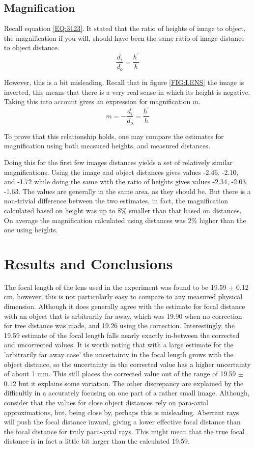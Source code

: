 \documentclass[]{article}
\begin{document}
\subsection{Magnification}
Recall equation \eqref{EQ:3123}. It stated that the ratio of heights of image to object, the magnification if you will, should have been the same ratio of image distance to object distance.
\begin{equation}
	\frac{d_i}{d_o} = \frac{h^\prime}{h}
\end{equation}

However, this is a bit misleading. Recall that in figure \ref{FIG:LENS} the image is inverted, this means that there is a very real sense in which its height is negative. Taking this into account gives an expression for magnification \(m\).
\begin{equation}
	m = -\frac{d_i}{d_o} = \frac{h^\prime}{h}
\end{equation}

To prove that this relationship holds, one may compare the estimates for magnification using both measured heights, and measured distances.

Doing this for the first few images distances yields a set of relatively similar magnifications. Using the image and object distances gives values -2.46, -2.10, and -1.72 while doing the same with the ratio of heights gives values -2.34, -2.03, -1.63. The values are generally in the same area, as they should be. But there is a non-trivial difference between the two estimates, in fact, the magnification calculated based on height was up to 8\% smaller than that based on distances. On average the magnification calculated using distances was 2\% higher than the one using heights. 
\section{Results and Conclusions}
The focal length of the lens used in the experiment was found to be 19.59 \(\pm\) 0.12 cm, however, this is not particularly easy to compare to any measured physical dimension. Although it does generally agree with the estimate for focal distance with an object that is arbitrarily far away, which was 19.90 when no correction for tree distance was made, and 19.26 using the correction. Interestingly, the 19.59 estimate of the focal length falls nearly exactly in-between the corrected and uncorrected values. It is worth noting that with a large estimate for the 'arbitrarily far away case' the uncertainty in the focal length grows with the object distance, so the uncertainty in the corrected value has a higher uncertainty of about 1 mm. This still places the corrected value out of the range of 19.59 \(\pm\) 0.12 but it explains some variation. The other discrepancy are explained by the difficultly in a accurately focusing on one part of a rather small image. Although, consider that the values for close object distances rely on para-axial approximations, but, being close by, perhaps this is misleading. Aberrant rays will push the focal distance inward, giving a lower effective focal distance than the focal distance for truly para-axial rays. This might mean that the true focal distance is in fact a little bit larger than the calculated 19.59.
\end{document}
